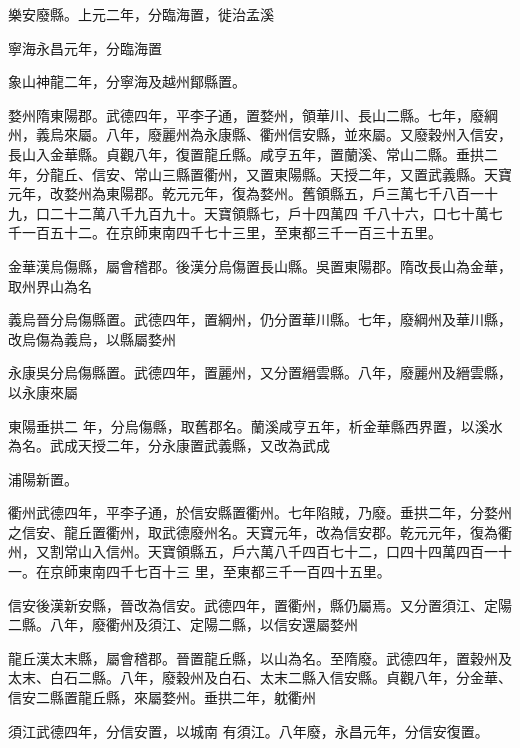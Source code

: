 \begin{pinyinscope}
 樂安廢縣。上元二年，分臨海置，徙治孟溪



 寧海永昌元年，分臨海置



 象山神龍二年，分寧海及越州鄮縣置。



 婺州隋東陽郡。武德四年，平李子通，置婺州，領華川、長山二縣。七年，廢綱州，義烏來屬。八年，廢麗州為永康縣、衢州信安縣，並來屬。又廢穀州入信安，長山入金華縣。貞觀八年，復置龍丘縣。咸亨五年，置蘭溪、常山二縣。垂拱二年，分龍丘、信安、常山三縣置衢州，又置東陽縣。天授二年，又置武義縣。天寶元年，改婺州為東陽郡。乾元元年，復為婺州。舊領縣五，戶三萬七千八百一十九，口二十二萬八千九百九十。天寶領縣七，戶十四萬四
 千八十六，口七十萬七千一百五十二。在京師東南四千七十三里，至東都三千一百三十五里。



 金華漢烏傷縣，屬會稽郡。後漢分烏傷置長山縣。吳置東陽郡。隋改長山為金華，取州界山為名



 義烏晉分烏傷縣置。武德四年，置綱州，仍分置華川縣。七年，廢綱州及華川縣，改烏傷為義烏，以縣屬婺州



 永康吳分烏傷縣置。武德四年，置麗州，又分置縉雲縣。八年，廢麗州及縉雲縣，以永康來屬



 東陽垂拱二
 年，分烏傷縣，取舊郡名。蘭溪咸亨五年，析金華縣西界置，以溪水為名。武成天授二年，分永康置武義縣，又改為武成



 浦陽新置。



 衢州武德四年，平李子通，於信安縣置衢州。七年陷賊，乃廢。垂拱二年，分婺州之信安、龍丘置衢州，取武德廢州名。天寶元年，改為信安郡。乾元元年，復為衢州，又割常山入信州。天寶領縣五，戶六萬八千四百七十二，口四十四萬四百一十一。在京師東南四千七百十三
 里，至東都三千一百四十五里。



 信安後漢新安縣，晉改為信安。武德四年，置衢州，縣仍屬焉。又分置須江、定陽二縣。八年，廢衢州及須江、定陽二縣，以信安還屬婺州



 龍丘漢太末縣，屬會稽郡。晉置龍丘縣，以山為名。至隋廢。武德四年，置穀州及太末、白石二縣。八年，廢穀州及白石、太末二縣入信安縣。貞觀八年，分金華、信安二縣置龍丘縣，來屬婺州。垂拱二年，躭衢州



 須江武德四年，分信安置，以城南
 有須江。八年廢，永昌元年，分信安復置。




\end{pinyinscope}

